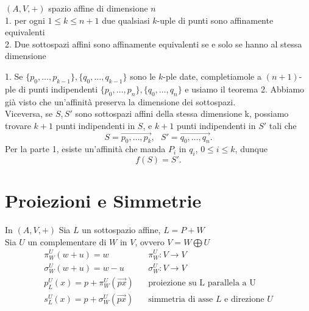 \documentclass[12px]{article}
\begin{document}
\begin{coro}
	$(A,V,+)$ spazio affine di dimensione $n$\\
	1. per ogni $1\leq k\leq n + 1$ due qualsiasi $k$-uple di punti sono affinamente equivalenti\\
	2. Due sottospazi affini sono affinamente equivalenti se e solo se hanno al stessa dimensione
\end{coro}
\begin{dimo}
	1. Se $\{p_0,\ldots,p_{k-1}\}, \{q_0,\ldots,q_{k - 1}\}$ sono le $k$-ple date, completiamole a $(n+1)$-ple di punti indipendenti $\{p_0,\ldots,p_n\}, \{q_0,\ldots,q_n\}$ e usiamo il teorema
	2. Abbiamo già visto che un'affinità preserva la dimensione dei sottospazi.\\
	Viceversa, se $S,S'$ sono sottospazi affini della stessa dimensione k, possiamo trovare $k+1$ punti indipendenti in $S$, e $k+1$ punti indipendenti in $S'$ tali che \[
	S = \overrightarrow{p_0,\ldots,p_k}, \ \ \ S'=\overrightarrow{q_0,\ldots,q_n}
	.\] 
	Per la parte 1, esiste un'affinità che manda $P_i$ in $q_i$, $0\leq i \leq k$, dunque \[
	f(S) = S'
	.\]
\end{dimo}
\newpage
\section{Proiezioni e Simmetrie}
\begin{defi}
In $(A,V,+)$ Sia $L$ un sottospazio affine, $L = P+W$\\
Sia $U$ un complementare di $W$ in $V$, ovvero  $V = W\bigoplus U$
\begin{align*}
	\pi_W^U(w+u)=w \ \ \ \ \ \ \ \ \ \ \ & \pi_W^U:V \rightarrow V\\
	\sigma_W^U(w+u) = w - u \ \ \ \ \ & \sigma_W^U:V \rightarrow V \\
	p_L^U(x) = p+\pi_W^U(\overrightarrow{px}) \ \ \ \ &\text{proiezione su L parallela a U}\\
	s_L^U(x) = p+\sigma_W^U(\overrightarrow{px}) \ \ \ \ &\text{simmetria di asse $L$ e direzione $U$}
\end{align*}
\end{defi}
\end{document}
